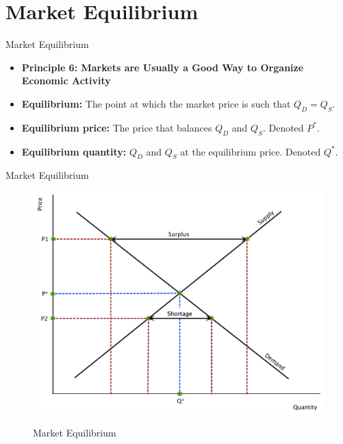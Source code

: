 \documentclass[xcolor={dvipsnames},pdf, hyperref={colorlinks=true, citecolor=ForestGreen, linkcolor=BlueViolet, urlcolor=Magenta}]{beamer}
\theoremstyle{definition}
\newcommand{\defn}[1]{\textbf{#1}}
\newcommand{\ddp}[1]{{\textcolor{ForestGreen}{#1}}}
\begin{document}
\section{Market Equilibrium}

\begin{frame}{Market Equilibrium}
	\begin{itemize}
		\item \textbf{Principle 6: Markets are Usually a Good Way to Organize Economic Activity}
		\item \defn{Equilibrium:} The point at which the market price is such that $Q_D = Q_S$.
		\item \defn{Equilibrium price:} The price that balances $Q_D$ and $Q_S$. Denoted $P^*$.
		\item \defn{Equilibrium quantity:} $Q_D$ and $Q_S$ at the equilibrium price. Denoted $Q^*$.
	\end{itemize}
\end{frame}

\begin{frame}[b]{Market Equilibrium}
		
		\begin{figure}[H]
			\centering
			\ddp{\includegraphics[scale=.4]{plot13.pdf}}
			\caption{Market Equilibrium}
		\end{figure}
		
	
\end{frame}
\end{document}
